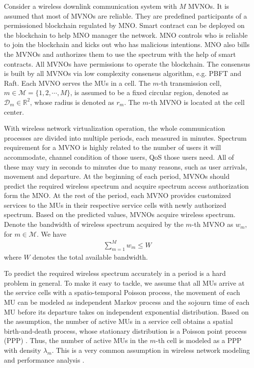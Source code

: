 \documentclass[journal]{IEEEtran}
\begin{document}
Consider a wireless downlink communication system with $M$ MVNOs.{
	\color{red}
	It is assumed that most of MVNOs are reliable. They are predefined participants of a permissioned blockchain regulated by MNO. Smart contract can be deployed on the blockchain to help MNO manager the network. MNO controls who is reliable to join the blockchain and kicks out who has malicious intentions. MNO also bills the MVNOs and authorizes them to use the spectrum with the help of smart contracts. All MVNOs have permissions to operate the blockchain. The consensus is built by all MVNOs via low complexity consensus algorithm, e.g. PBFT and Raft.} 
Each MVNO serves the MUs in a cell. The $m$-th transmission cell, $m\in\mathcal{M}=\{1,2,\cdots,M\}$, is assumed to be a fixed circular region, denoted as  $\mathcal{D}_m\in \mathbb{R}^2$, whose radius is denoted as $r_m$. The $m$-th MVNO is located at the cell center.

With wireless network virtualization operation, the whole communication processes are divided into multiple periods, each measured in minutes.{
\color{red}
Spectrum requirement for a MVNO is highly related to the number of users it will accommodate, channel condition of those users, QoS those users need. All of these may vary in seconds to minutes due to many reasons, such as user arrivals, movement and departure. At the beginning of each period, MVNOs should predict the required wireless spectrum and acquire spectrum access authorization form the MNO. At the rest of the period, each MVNO provides customized services to the MUs in their respective service cells with newly authorized spectrum.}  
Based on the predicted values, MVNOs acquire wireless spectrum. Denote the bandwidth of wireless spectrum acquired by the $m$-th MVNO as $w_m$, for $m\in\mathcal{M}$. We have
\begin{align}
	\label{q1}
\sum_{m=1}^{M} w_m \leq W
\end{align}
where $W$ denotes the total available bandwidth.

{
	\color{red}
	To predict the required wireless spectrum accurately in a period is a hard problem in general. To make it easy to tackle, we assume that all MUs arrive at the service cells with a spatio-temporal Poisson process, the movement of each MU can be modeled as independent Markov process and the sojourn time of each MU before its departure takes on independent exponential distribution. Based on the assumption, the number of active MUs in a service cell obtains a spatial birth-and-death process, whose stationary distribution is a Poisson point process (PPP) \cite{FBaccelli,RSerfozo}. Thus, the number of active MUs in the $m$-th cell is modeled as a PPP with density $\lambda_m$. This is a very common assumption in wireless network modeling and performance analysis \cite{JGAndrews, HSDhillon}.
} 
 
\end{document}
